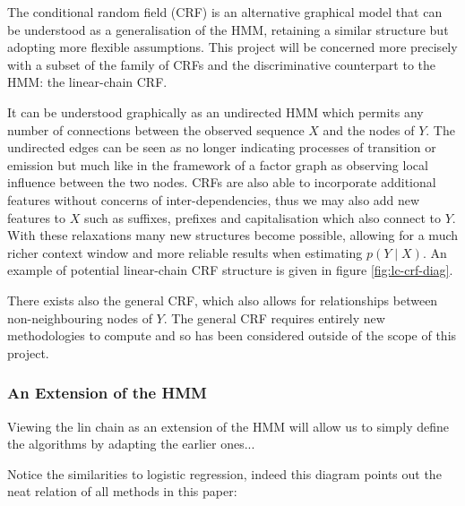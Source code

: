 \documentclass[../main.tex]{subfiles}
\begin{document}

The conditional random field (CRF) \autocite{lafferty-crf-2001} is an alternative graphical model that can be understood as a generalisation of the HMM, retaining a similar structure but adopting more flexible assumptions.
This project will be concerned more precisely with a subset of the family of CRFs and the discriminative counterpart to the HMM: the linear-chain CRF.

It can be understood graphically as an undirected HMM which permits any number of connections between the observed sequence $X$ and the nodes of $Y$.
The undirected edges can be seen as no longer indicating processes of transition or emission but much like in the framework of a factor graph as observing local influence between the two nodes.
CRFs are also able to incorporate additional features without concerns of inter-dependencies, thus we may also add new features to $X$ such as suffixes, prefixes and capitalisation which also connect to $Y$.
With these relaxations many new structures become possible, allowing for a much richer context window and more reliable results when estimating $p(Y \mid X)$.
An example of potential linear-chain CRF structure is given in figure \ref{fig:lc-crf-diag}.



There exists also the general CRF, which also allows for relationships between non-neighbouring nodes of $Y$.
The general CRF requires entirely new methodologies to compute and so has been considered outside of the scope of this project.

\subsubsection{An Extension of the HMM}
Viewing the lin chain as an extension of the HMM will allow us to simply define the algorithms by adapting the earlier ones...

Notice the similarities to logistic regression, indeed this diagram points out the neat relation of all methods in this paper:
\end{document}
